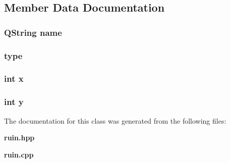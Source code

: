 \subsection{Member Data Documentation}
\subsubsection{\setlength{\rightskip}{0pt plus 5cm}QString {\bf name}}\label{classRuin_o0}


\subsubsection{ {\bf type}}\label{classRuin_o3}


\subsubsection{\setlength{\rightskip}{0pt plus 5cm}int {\bf x}}\label{classRuin_o1}


\subsubsection{\setlength{\rightskip}{0pt plus 5cm}int {\bf y}}\label{classRuin_o2}




The documentation for this class was generated from the following files:\begin{CompactItemize}
\item 
{\bf ruin.hpp}\item 
{\bf ruin.cpp}\end{CompactItemize}
